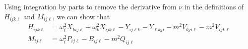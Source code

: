 \documentclass[letterpaper,11pt]{article}
\newcommand{\oi}{\omega_i}
\newcommand{\ok}{\omega_k}
\begin{document}
Using integration by parts to remove the derivative from $\nu$ in the definitions of $H_{ijk\ell}$ and $M_{ij\ell}$, we can show that
\begin{align}
H_{ijk\ell} &= \oi^2 X_{kij\ell} + \ok^2 X_{ijk\ell} - Y_{ij\ell k}  - Y_{\ell kji}   - m^2 V_{kji\ell} -m^2 V_{ijk\ell} \\
M_{ij\ell} &= \oi^2 P_{ij\ell} - B_{ij\ell} -m^2 Q_{ij\ell}
\end{align}







\end{document}
